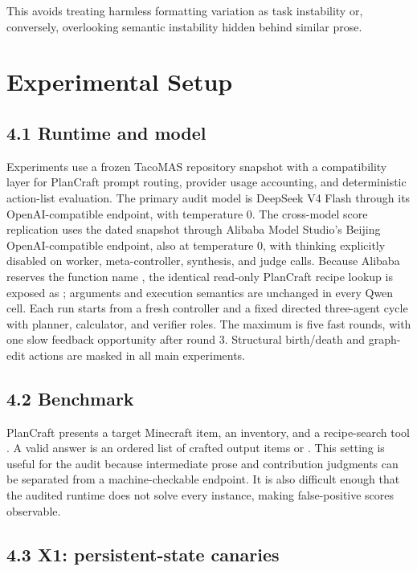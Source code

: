 \documentclass{article}
\begin{document}
This avoids treating harmless formatting variation as task instability or, conversely, overlooking semantic instability hidden behind similar prose.

\section{Experimental Setup}

\subsection{4.1 Runtime and model}

Experiments use a frozen TacoMAS repository snapshot with a compatibility layer for PlanCraft prompt routing, provider usage accounting, and deterministic action-list evaluation. The primary audit model is DeepSeek V4 Flash through its OpenAI-compatible endpoint, with temperature 0. The cross-model score replication uses the dated \texttt{} snapshot through Alibaba Model Studio's Beijing OpenAI-compatible endpoint, also at temperature 0, with thinking explicitly disabled on worker, meta-controller, synthesis, and judge calls. Because Alibaba reserves the function name \texttt{}, the identical read-only PlanCraft recipe lookup is exposed as \texttt{}; arguments and execution semantics are unchanged in every Qwen cell. Each run starts from a fresh controller and a fixed directed three-agent cycle with planner, calculator, and verifier roles. The maximum is five fast rounds, with one slow feedback opportunity after round 3. Structural birth/death and graph-edit actions are masked in all main experiments.

\subsection{4.2 Benchmark}

PlanCraft presents a target Minecraft item, an inventory, and a recipe-search tool \citep{dagan2025plancraft}. A valid answer is an ordered list of crafted output items or \texttt{}. This setting is useful for the audit because intermediate prose and contribution judgments can be separated from a machine-checkable endpoint. It is also difficult enough that the audited runtime does not solve every instance, making false-positive scores observable.

\subsection{4.3 X1: persistent-state canaries}
\end{document}
